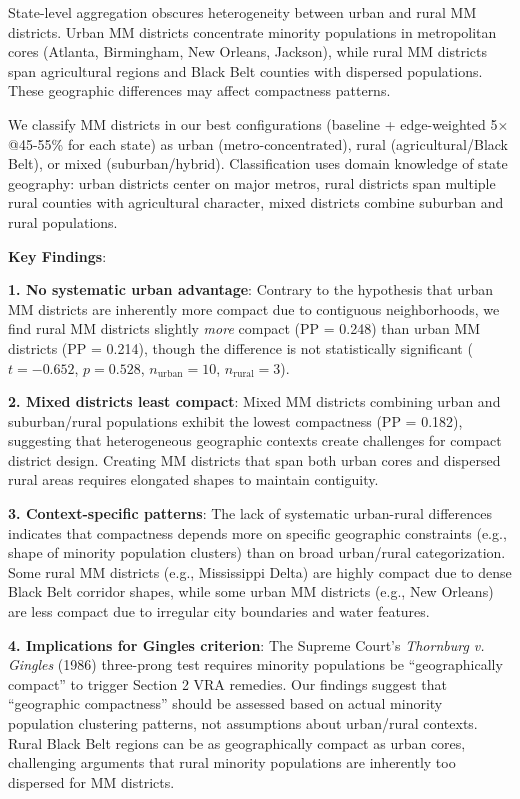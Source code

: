 State-level aggregation obscures heterogeneity between urban and rural MM districts. Urban MM districts concentrate minority populations in metropolitan cores (Atlanta, Birmingham, New Orleans, Jackson), while rural MM districts span agricultural regions and Black Belt counties with dispersed populations. These geographic differences may affect compactness patterns.

We classify MM districts in our best configurations (baseline + edge-weighted 5$\times$@45-55\% for each state) as urban (metro-concentrated), rural (agricultural/Black Belt), or mixed (suburban/hybrid). Classification uses domain knowledge of state geography: urban districts center on major metros, rural districts span multiple rural counties with agricultural character, mixed districts combine suburban and rural populations.



\textbf{Key Findings}:

\textbf{1. No systematic urban advantage}: Contrary to the hypothesis that urban MM districts are inherently more compact due to contiguous neighborhoods, we find rural MM districts slightly \emph{more} compact (PP = 0.248) than urban MM districts (PP = 0.214), though the difference is not statistically significant ($t = -0.652$, $p = 0.528$, $n_{\text{urban}} = 10$, $n_{\text{rural}} = 3$).

\textbf{2. Mixed districts least compact}: Mixed MM districts combining urban and suburban/rural populations exhibit the lowest compactness (PP = 0.182), suggesting that heterogeneous geographic contexts create challenges for compact district design. Creating MM districts that span both urban cores and dispersed rural areas requires elongated shapes to maintain contiguity.

\textbf{3. Context-specific patterns}: The lack of systematic urban-rural differences indicates that compactness depends more on specific geographic constraints (e.g., shape of minority population clusters) than on broad urban/rural categorization. Some rural MM districts (e.g., Mississippi Delta) are highly compact due to dense Black Belt corridor shapes, while some urban MM districts (e.g., New Orleans) are less compact due to irregular city boundaries and water features.

\textbf{4. Implications for Gingles criterion}: The Supreme Court's \emph{Thornburg v. Gingles} (1986) three-prong test requires minority populations be ``geographically compact'' to trigger Section 2 VRA remedies. Our findings suggest that ``geographic compactness'' should be assessed based on actual minority population clustering patterns, not assumptions about urban/rural contexts. Rural Black Belt regions can be as geographically compact as urban cores, challenging arguments that rural minority populations are inherently too dispersed for MM districts.

